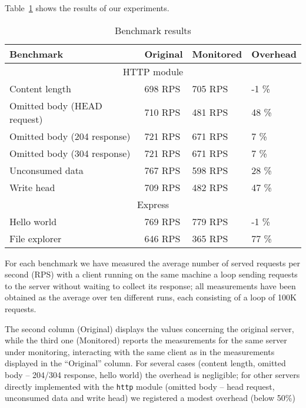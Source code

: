 Table~\ref{table} shows the results of our experiments. 
\begin{table}[ht]
  \begin{tabular}{|l|l|l|l|}
    \hline
    \textbf{Benchmark} & 
    \textbf{Original} &
    \textbf{Monitored} &
    \textbf{Overhead} \\
    \hline
    \multicolumn{4}{|c|}{HTTP module}\\
    \hline
    Content length & 
    698 RPS &
    705 RPS &
    -1 \% \\

    Omitted body (HEAD request)&
    710 RPS &
    481 RPS &
    48 \% \\

    Omitted body (204 response)&
    721 RPS &
    671 RPS &
    7 \% \\

    Omitted body (304 response)&
    721 RPS &
    671 RPS &
    7 \% \\

    Unconsumed data &
     767 RPS &
     598 RPS &
     28 \% \\

    Write head &
    709 RPS &
    482 RPS &
    47 \% \\
    \hline

    \multicolumn{4}{|c|}{Express}\\
    \hline
    Hello world & 
    769 RPS &
    779 RPS &
    -1 \% \\

    File explorer &
    646 RPS &
    365 RPS &
    77 \%\\

    \hline
  \end{tabular}
  \caption{Benchmark results}
  \label{table}
\end{table}
For each benchmark we have measured the average number of served requests per second (RPS) 
with a client running on the same machine a loop sending requests to the server without waiting to collect its response;
all measurements have been obtained as the average over ten different runs, each consisting
of a loop of 100K requests.

The second column (Original) displays the values concerning the original server, while the third one
(Monitored) reports the measurements for the same server under monitoring, interacting with the same client as in the measurements displayed in the ``Original'' column.
For several cases (content length, omitted body -- 204/304 response, hello world) the overhead is negligible;
for other servers directly implemented with the \lstinline{http} module (omitted body -- head request, unconsumed data and write head)
we registered a modest overhead (below 50\%)


